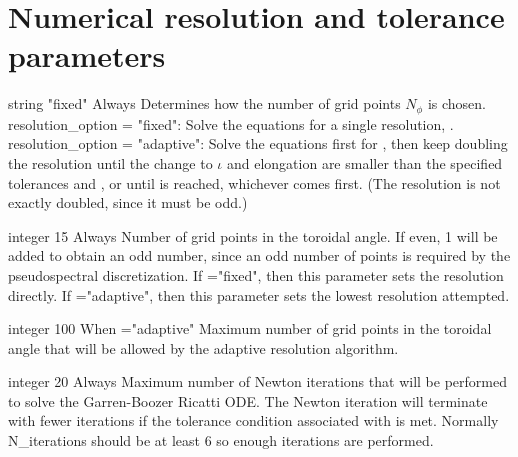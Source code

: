 \myhrule


\section{Numerical resolution and tolerance parameters}

{string}
{{\ttfamily "fixed"}}
{Always}
{Determines how the number of grid points $N_{\phi}$ is chosen.\\

{\ttfamily resolution\_option} = {\ttfamily "fixed"}: Solve the equations for a single resolution, .\\

{\ttfamily resolution\_option} = {\ttfamily "adaptive"}: Solve the equations first for , then keep doubling the resolution until the change to $\iota$ and elongation are smaller than the specified tolerances  and , or until  is reached, whichever comes first. (The resolution is not exactly doubled, since it must be odd.)\\

}

\myhrule

{integer}
{15}
{Always}
{Number of grid points in the toroidal angle. If even, 1 will be added to obtain an odd number, since an odd number of points is required by the pseudospectral discretization. If ={\ttfamily "fixed"}, then this parameter sets the resolution directly. If ={\ttfamily "adaptive"}, then this parameter sets the lowest resolution attempted.}

\myhrule

{integer}
{100}
{When ={\ttfamily "adaptive"}}
{Maximum number of grid points in the toroidal angle that will be allowed by the adaptive resolution algorithm.}

\myhrule

{integer}
{20}
{Always}
{Maximum number of Newton iterations that will be performed to solve the Garren-Boozer Ricatti ODE.  The Newton iteration will terminate with fewer iterations if the tolerance condition associated with  is met. Normally {\ttfamily N\_iterations} should be at least 6 so enough iterations are performed.}

